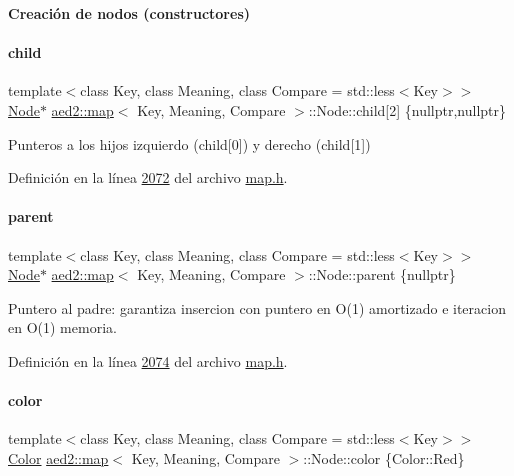 \begin{Indent}{\bf \-Creación de nodos (constructores)}
\paragraph{\texorpdfstring{child}{child}}
{\footnotesize\ttfamily template$<$class Key, class Meaning, class Compare = std\+::less$<$\+Key$>$$>$ \\
\hyperlink{structaed2_1_1map_1_1Node}{Node}$\ast$ \hyperlink{classaed2_1_1map}{aed2\+::map}$<$ Key, Meaning, Compare $>$\+::Node\+::child\mbox{[}2\mbox{]} \{nullptr,nullptr\}}



Punteros a los hijos izquierdo (child\mbox{[}0\mbox{]}) y derecho (child\mbox{[}1\mbox{]}) 



Definición en la línea \hyperlink{map_8h_source_l02072}{2072} del archivo \hyperlink{map_8h_source}{map.\+h}.

\mbox{\label{structaed2_1_1map_1_1Node_ab6a5f9e471b311755e4a56834086cb90_ab6a5f9e471b311755e4a56834086cb90}} 
\paragraph{\texorpdfstring{parent}{parent}}
{\footnotesize\ttfamily template$<$class Key, class Meaning, class Compare = std\+::less$<$\+Key$>$$>$ \\
\hyperlink{structaed2_1_1map_1_1Node}{Node}$\ast$ \hyperlink{classaed2_1_1map}{aed2\+::map}$<$ Key, Meaning, Compare $>$\+::Node\+::parent \{nullptr\}}



Puntero al padre\+: garantiza insercion con puntero en O(1) amortizado e iteracion en O(1) memoria. 



Definición en la línea \hyperlink{map_8h_source_l02074}{2074} del archivo \hyperlink{map_8h_source}{map.\+h}.

\mbox{\label{structaed2_1_1map_1_1Node_a58dd9993fee8ee3eaa5716b72a3eca47_a58dd9993fee8ee3eaa5716b72a3eca47}} 
\paragraph{\texorpdfstring{color}{color}}
{\footnotesize\ttfamily template$<$class Key, class Meaning, class Compare = std\+::less$<$\+Key$>$$>$ \\
\hyperlink{classaed2_1_1map_a6d62a415a4b9d320b30cada4ebcf9f5b_a6d62a415a4b9d320b30cada4ebcf9f5b}{Color} \hyperlink{classaed2_1_1map}{aed2\+::map}$<$ Key, Meaning, Compare $>$\+::Node\+::color \{Color\+::\+Red\}}




\end{Indent}
